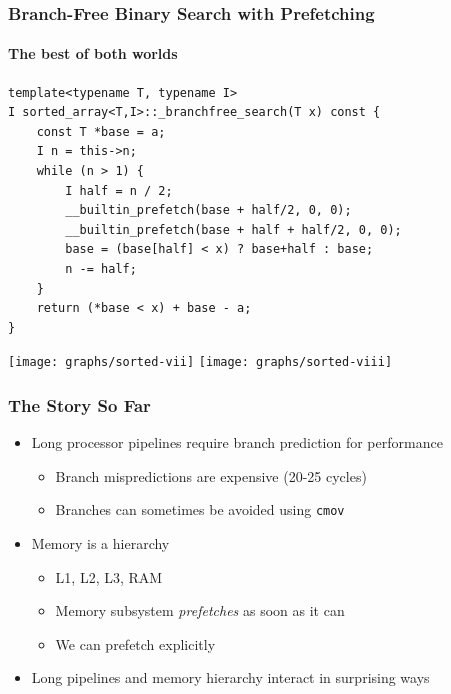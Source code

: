 \documentclass[xcolor=dvipsnames]{beamer}
\begin{document}
\begin{frame}[fragile]
   \frametitle{Branch-Free Binary Search with Prefetching}
   \framesubtitle{The best of both worlds}

   {\tiny
   \begin{verbatim}
template<typename T, typename I>
I sorted_array<T,I>::_branchfree_search(T x) const {
    const T *base = a;
    I n = this->n;
    while (n > 1) {
        I half = n / 2;
        __builtin_prefetch(base + half/2, 0, 0);
        __builtin_prefetch(base + half + half/2, 0, 0);
        base = (base[half] < x) ? base+half : base;
        n -= half;
    }
    return (*base < x) + base - a;
}
   \end{verbatim}
   }
   \texttt{[image: graphs/sorted-vii]}
   \texttt{[image: graphs/sorted-viii]}

\end{frame}

\begin{frame}[fragile]
   \frametitle{The Story So Far}

   \begin{itemize}
      \item<+->Long processor pipelines require branch prediction
               for performance
      \begin{itemize}
         \item<+->Branch mispredictions are expensive (20-25 cycles)
         \item<+->Branches can sometimes be avoided using 
                  \texttt{cmov}
      \end{itemize}
      \item<+->Memory is a hierarchy
      \begin{itemize}
         \item<+->L1, L2, L3, RAM%
            \only<+->{,\ldots}
         \item<+->Memory subsystem \emph{prefetches} as soon as it can
         \item<+->We can prefetch explicitly
      \end{itemize}
      \item<+->Long pipelines and memory hierarchy interact in surprising
               ways
   \end{itemize}
\end{frame}
\end{document}
